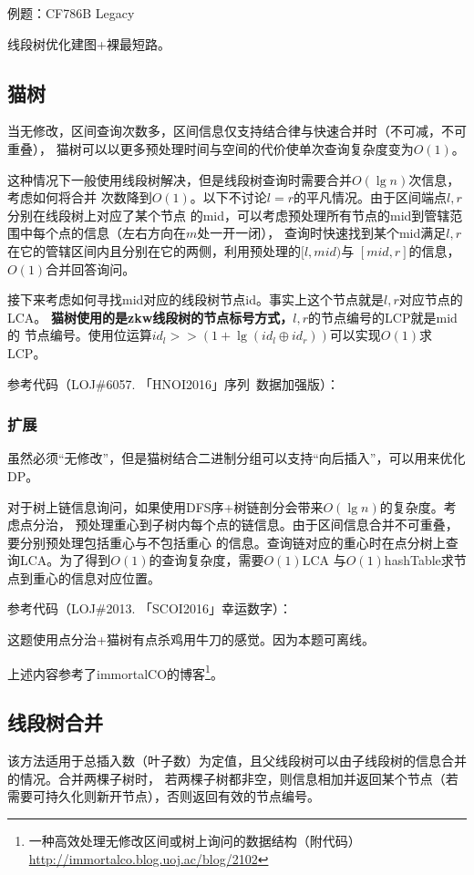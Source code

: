 例题：CF786B Legacy

线段树优化建图+裸最短路。


\subsection{猫树}
当无修改，区间查询次数多，区间信息仅支持结合律与快速合并时（不可减，不可重叠），
猫树可以以更多预处理时间与空间的代价使单次查询复杂度变为$O(1)$。

这种情况下一般使用线段树解决，但是线段树查询时需要合并$O(\lg n)$次信息，考虑如何将合并
次数降到$O(1)$。以下不讨论$l=r$的平凡情况。由于区间端点$l,r$分别在线段树上对应了某个节点
的mid，可以考虑预处理所有节点的mid到管辖范围中每个点的信息（左右方向在$m$处一开一闭），
查询时快速找到某个mid满足$l,r$在它的管辖区间内且分别在它的两侧，利用预处理的$[l,mid)$与
$[mid,r]$的信息，$O(1)$合并回答询问。

接下来考虑如何寻找mid对应的线段树节点id。事实上这个节点就是$l,r$对应节点的LCA。
{\bfseries 猫树使用的是zkw线段树的节点标号方式，}$l,r$的节点编号的LCP就是mid的
节点编号。使用位运算$id_l>>(1+\lg(id_l\oplus id_r))$可以实现$O(1)$求LCP。

参考代码（LOJ\#6057. 「HNOI2016」序列~数据加强版）：


\subsubsection{扩展}
虽然必须``无修改''，但是猫树结合二进制分组可以支持``向后插入''，可以用来优化DP。

对于树上链信息询问，如果使用DFS序+树链剖分会带来$O(\lg n)$的复杂度。考虑点分治，
预处理重心到子树内每个点的链信息。由于区间信息合并不可重叠，要分别预处理包括重心与不包括重心
的信息。查询链对应的重心时在点分树上查询LCA。为了得到$O(1)$的查询复杂度，需要$O(1)$LCA
与$O(1)$hashTable求节点到重心的信息对应位置。

参考代码（LOJ\#2013. 「SCOI2016」幸运数字）：

这题使用点分治+猫树有点杀鸡用牛刀的感觉。因为本题可离线。



上述内容参考了immortalCO的博客\footnote{
    一种高效处理无修改区间或树上询问的数据结构（附代码）
    \url{http://immortalco.blog.uoj.ac/blog/2102}
}。
\subsection{线段树合并}
该方法适用于总插入数（叶子数）为定值，且父线段树可以由子线段树的信息合并的情况。合并两棵子树时，
若两棵子树都非空，则信息相加并返回某个节点（若需要可持久化则新开节点），否则返回有效的节点编号。

